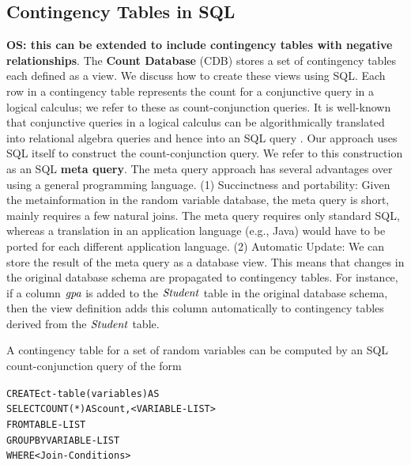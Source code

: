 \documentclass{acm_proc_article-sp}
\begin{document}
\subsection{Contingency Tables in SQL} \textbf{OS: this can be extended to include contingency tables with negative relationships}. The \textbf{Count Database} (CDB) stores a set of contingency tables each defined as a view. We discuss how to create these views using SQL.  
Each row in a contingency table represents the count for a conjunctive query in a logical calculus; we refer to these as count-conjunction queries.
It is well-known that conjunctive queries in a logical calculus can be algorithmically translated into relational algebra queries and hence into an SQL query \cite{Ullman1982}. Our approach uses SQL itself to construct the count-conjunction query. We refer to this construction as an SQL \textbf{meta query}. The meta query approach has several advantages over using a general programming language. (1) Succinctness and portability: Given the metainformation in the random variable database, the meta query is short, mainly requires a few natural joins. The meta query requires only standard SQL, whereas a translation in an application language (e.g., Java) would have to be ported for each different application language. (2) Automatic Update: We can store the result of the meta query as a database view. This means that changes in the original database schema are propagated to contingency tables. For instance, if a column $\it{gpa}$ is added to the $\it{Student}$ table in the original database schema, then the view definition adds this column automatically to contingency tables derived from the $\it{Student}$ table.

A contingency table for a set of random variables can be computed by an SQL count-conjunction query of the form 
\begin{alltt}
CREATE ct-table(variables) AS
SELECT COUNT(*) AS count, <VARIABLE-LIST>
FROM TABLE-LIST
GROUP BY VARIABLE-LIST
WHERE <Join-Conditions>
\end{alltt}
\end{document}
